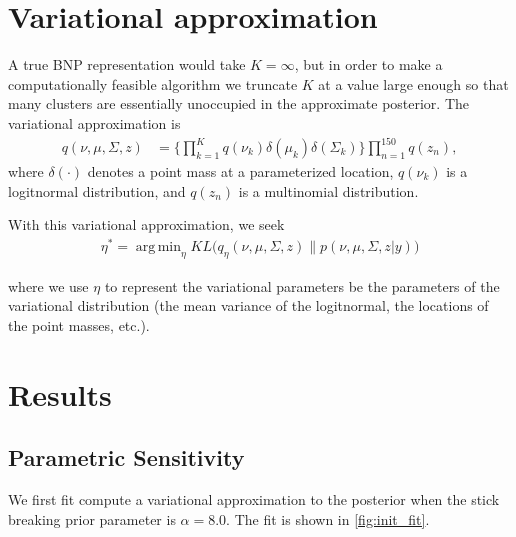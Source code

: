 \documentclass[a4paper]{article}
\DeclareMathOperator*{\argmin}{arg\,min}
\begin{document}
\section{Variational approximation}
A true BNP representation would take $K = \infty$, but in order to make a computationally feasible
algorithm we truncate $K$ at a value large enough so that many clusters are essentially unoccupied in
the approximate posterior. The variational approximation is
\begin{align}
q(\nu, \mu, \Sigma, z) & =
\Big\{\prod_{k=1}^{K}q\left(\nu_{k}\right)\delta\left(\mu_{k}\right)\delta\left(\Sigma_{k}\right)\Big\} \prod_{n=1}^{150}q\left(z_{n}\right),
\end{align}
where $\delta\left(\cdot\right)$ denotes a point mass at a parameterized
location, $q\left(\nu_{k}\right)$ is a logitnormal distribution, and $q\left(z_{n}\right)$
is a multinomial distribution.

With this variational approximation, we seek
\begin{align}
\eta^* = \argmin_{\eta} KL\Big(q_\eta(\nu, \mu, \Sigma, z) \big\| p(\nu, \mu, \Sigma, z | y)\Big) \label{eq:kl_objective}
\end{align}

where we use $\eta$ to represent the variational parameters be the parameters of the variational distribution
(the mean variance of the logitnormal, the locations of the point masses, etc.).

\section{Results}

\subsection{Parametric Sensitivity}
We first fit compute a variational approximation to the posterior when the stick breaking
prior parameter is $\alpha = 8.0$. The fit is shown in
\ref{fig:init_fit}.
\end{document}
